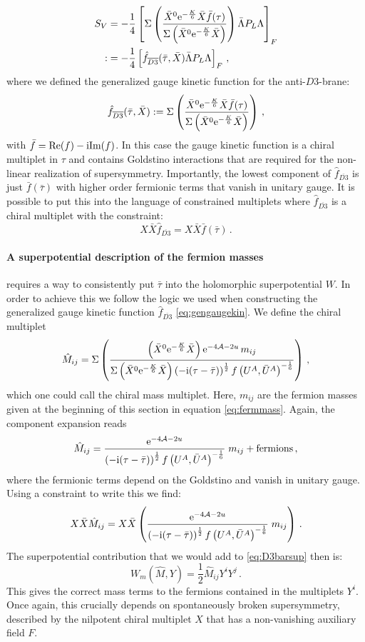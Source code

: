\documentclass[a4paper,12pt]{report}
\newcommand{\be}{\begin{equation}}
\newcommand{\ee}{\end{equation}}
\newcommand{\bea}{\begin{equation}\begin{aligned}}
\newcommand{\eea}{\end{aligned}\end{equation}}
\def\rmi{{\rm i}}
\def\rme{{\rm e}}
\def\rmre{{\rm Re}}
\def\rmim{{\rm Im}}
\begin{document}
\bea 
S_V &= -\frac{1}{4} \left[\Sigma\left(\frac{\bar{X}^0 \rme^{-\frac{K}{6}} \bar{X} \bar{f}(\tau)}{\Sigma \left(\bar{X}^0\rme^{-\frac{K}{6}}\bar{X}\right)}\right)\bar{\Lambda}P_L\Lambda\right]_F\\
:&= -\frac{1}{4} \left[\hat{f}_{\overline{D3}}(\bar{\tau},\bar{X})\bar{\Lambda}P_L\Lambda\right]_F\,,
\eea 
where we defined the generalized gauge kinetic function for the anti-$D3$-brane:
\bea 
\hat{f}_{\overline{D3}}(\bar{\tau},\bar{X}) := \Sigma\left(\frac{\bar{X}^0 \rme^{-\frac{K}{6}} \bar{X} \bar{f}(\tau)}{\Sigma \left(\bar{X}^0\rme^{-\frac{K}{6}}\bar{X}\right)}\right)\,,
\label{eq:gengaugekin}
\eea
with $\bar{f} = \rmre(f)-\rmi \rmim(f)$. In this case the gauge kinetic function is a chiral multiplet in $\tau$ and contains Goldstino interactions that are required for the non-linear realization of supersymmetry. Importantly, the lowest component of $\hat{f}_{\overline{D3}}$ is just $\bar{f}(\bar{\tau})$ with higher order fermionic terms that vanish in unitary gauge. It is possible to put this into the language of constrained multiplets where $\hat{f}_{\overline{D3}}$ is a chiral multiplet with the constraint:
\be 
X\bar{X}\hat{f}_{\overline{D3}} = X \bar{X}\bar{f}(\bar{\tau})\,.
\ee

\paragraph{A superpotential description of the fermion masses} requires a way to consistently put $\bar{\tau}$ into the holomorphic superpotential $W$. In order to achieve this we follow the logic we used when constructing the generalized gauge kinetic function $\hat{f}_{\overline{D3}}$ \eqref{eq:gengaugekin}. We define the chiral multiplet
\be 
\hat{M}_{ij} = \Sigma \left(\frac{\left(\bar{X}^0 \rme^{-\frac{K}{6}}\bar{X}\right)\rme^{-4\mathcal{A}-2u}\,m_{ij}}{\Sigma\left(\bar{X}^0 \rme^{-\frac{K}{6}}\bar{X}\right)\left(-\rmi (\tau-\bar{\tau})\right)^{\frac{1}{2}}f\left(U^A,\bar{U}^A\right)^{-\frac{1}{6}}}\right)\,,
\ee
which one could call the chiral mass multiplet. Here, $m_{ij}$ are the fermion masses given at the beginning of this section in equation \eqref{eq:fermmass}. Again, the component expansion reads
\be 
\hat{M}_{ij} = \frac{\rme^{-4\mathcal{A}-2u}}{\left(-\rmi (\tau-\bar{\tau})\right)^{\frac{1}{2}}f\left(U^A,\bar{U}^A\right)^{-\frac{1}{6}}} \; m_{ij} + \text{fermions}\,,
\ee
where the fermionic terms depend on the Goldstino and vanish in unitary gauge. Using a constraint to write this we find:
\be 
X\bar{X} \hat{M}_{ij} = X \bar{X} \left( \frac{\rme^{-4\mathcal{A}-2u}}{\left(-\rmi (\tau-\bar{\tau})\right)^{\frac{1}{2}}f\left(U^A,\bar{U}^A\right)^{-\frac{1}{6}}}\; m_{ij} \right)\,.
\ee 
The superpotential contribution that we would add to \eqref{eq:D3barsup} then is:
\be 
W_m(\hat{M},Y) = \frac{1}{2} \hat{M}_{ij}Y^iY^j\,.
\ee
This gives the correct mass terms to the fermions contained in the multiplets $Y^i$. Once again, this crucially depends on spontaneously broken supersymmetry, described by the nilpotent chiral multiplet $X$ that has a non-vanishing auxiliary field $F$.
\end{document}
